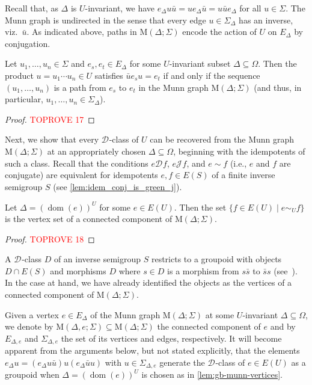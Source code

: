 \documentclass[anonymous,letter,UKenglish,cleveref,autoref,thm-restate]{lipics-v2021}
\newcommand{\sse}{\subseteq}
\newcommand{\dom}{\operatorname{dom}}
\newcommand*{\gD}[1][]{\mathrel{\mathcal{D}_{#1}}}
\newcommand*{\gJ}[1][]{\mathrel{\mathcal{J}_{#1}}}
\theoremstyle{plain}
\theoremstyle{plain}
\begin{document}
Recall that, as $\Delta$ is $U$-invariant, we have $e_\Delta u\bar u = ue_\Delta \bar u = u\bar u e_\Delta$ for all $u \in \Sigma$.
The Munn graph is undirected in the sense that every edge $u \in \Sigma_\Delta$ has an inverse, viz.\ $\bar u$.
As indicated above, paths in $\mathrm{M}(\Delta; \Sigma)$ encode the action of $U$ on $E_\Delta$ by conjugation.

\begin{lemma}\label{lem:gb-munn-paths}
  Let $u_1, \dotsc, u_n \in \Sigma$ and $e_s,e_t \in E_\Delta$ for some $U$-invariant subset $\Delta \sse \Omega$.
  Then the product $u = u_1 \cdots u_n \in U$ satisfies $\bar u e_s u = e_t$ if and only if the sequence $(u_1, \dotsc, u_n)$ is a path from $e_s$ to $e_t$ in the Munn graph $\mathrm{M}(\Delta; \Sigma)$ (and thus, in particular, $u_1, \dotsc, u_n \in \Sigma_\Delta$).
\end{lemma}

\begin{proof}\textcolor{red}{TOPROVE 17}\end{proof}

Next, we show that every $\gD$-class of $U$ can be recovered from the Munn graph $\mathrm{M}(\Delta; \Sigma)$ at an appropriately chosen $\Delta \sse \Omega$, beginning with the idempotents of such a class.
Recall that the conditions $e \gD f$, $e \gJ f$, and $e \sim f$ (i.e., $e$ and $f$ are conjugate) are equivalent for idempotents $e,f \in E(S)$ of a finite inverse semigroup $S$ (see \cref{lem:idem_conj_is_green_j}).


\begin{lemma}\label{lem:gb-munn-vertices}
  Let $\Delta = (\dom(e))^U$ for some $e \in E(U)$.
  Then the set $\{f \in E(U) \mid e \sim_U f\}$ is the vertex set of a connected component of $\mathrm{M}(\Delta; \Sigma)$.
\end{lemma}

\begin{proof}\textcolor{red}{TOPROVE 18}\end{proof}

A $\gD$-class $D$ of an inverse semigroup $S$ restricts to a groupoid with objects $D \cap E(S)$ and morphisms $D$ where $s \in D$ is a morphism from $s \bar s$ to $\bar s s$ (see~\cite{CliffordMiller56}).
In the case at hand, we have already identified the objects as the vertices of a connected component of $\mathrm{M}(\Delta; \Sigma)$.

Given a vertex $e \in E_\Delta$ of the Munn graph $\mathrm{M}(\Delta; \Sigma)$ at some $U$-invariant $\Delta \sse \Omega$, we denote by $\mathrm{M}(\Delta, e; \Sigma) \sse \mathrm{M}(\Delta; \Sigma)$ the connected component of $e$ and by $E_{\Delta,e}$ and $\Sigma_{\Delta,e}$ the set of its vertices and edges, respectively.
It will become apparent from the arguments below, but not stated explicitly, that the elements $e_\Delta u = (e_\Delta u \bar u) u (e_\Delta \bar u u)$ with $u \in \Sigma_{\Delta,e}$ generate the $\gD$-class of $e \in E(U)$ as a groupoid when $\Delta = (\dom(e))^U$ is chosen as in \cref{lem:gb-munn-vertices}.
\end{document}
